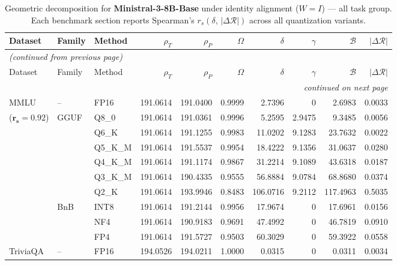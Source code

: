 \begingroup
\small
\setlength{\tabcolsep}{4pt}
\renewcommand{\arraystretch}{1.05}
\setlength{\LTcapwidth}{\textwidth}
\begin{longtable}{ll l rrrrrrr}
\caption{Geometric decomposition for \textbf{Ministral-3-8B-Base} under identity alignment ($W{=}I$) --- all task group. Each benchmark section reports Spearman's $r_s(\delta,\,|\Delta\mathcal{R}|)$ across all quantization variants.}\label{tab:mistral_decomposition_all}\\
\toprule
Dataset & Family & Method & $\rho_T$ & $\rho_P$ & $\Omega$ & $\delta$ & $\gamma$ & $\mathcal{B}$ & $|\Delta\mathcal{R}|$ \\
\midrule
\endfirsthead
\multicolumn{10}{l}{\small\itshape (continued from previous page)}\\
\toprule
Dataset & Family & Method & $\rho_T$ & $\rho_P$ & $\Omega$ & $\delta$ & $\gamma$ & $\mathcal{B}$ & $|\Delta\mathcal{R}|$ \\
\midrule
\endhead
\midrule
\multicolumn{10}{r}{\small\itshape continued on next page}\\
\endfoot
\bottomrule
\endlastfoot
MMLU & -- & FP16 & 191.0614 & 191.0400 & 0.9999 & 2.7396 & \cellcolor{cyan!12} $0$ & 2.6983 & 0.0033 \\
{\small ($\mathbf{r_s{=}0.92}$)} & GGUF & Q8\_0 & 191.0614 & 191.0361 & 0.9996 & 5.2595 & 2.9475 & 9.3485 & 0.0056 \\
 &  & Q6\_K & 191.0614 & 191.1255 & 0.9983 & 11.0202 & 9.1283 & 23.7632 & 0.0022 \\
 &  & Q5\_K\_M & 191.0614 & 191.5537 & 0.9954 & 18.4222 & 9.1356 & 31.0637 & 0.0280 \\
 &  & Q4\_K\_M & 191.0614 & 191.1174 & 0.9867 & 31.2214 & 9.1089 & 43.6318 & 0.0187 \\
 &  & Q3\_K\_M & 191.0614 & 190.4335 & 0.9555 & 56.8884 & 9.0784 & 68.8680 & 0.0374 \\
 &  & Q2\_K & 191.0614 & 193.9946 & \cellcolor{red!18} 0.8483 & \cellcolor{red!18} 106.0716 & 9.2112 & \cellcolor{red!18} 117.4963 & \cellcolor{red!18} 0.5035 \\
 & BnB & INT8 & 191.0614 & 191.2144 & 0.9956 & 17.9674 & \cellcolor{cyan!12} $0$ & 17.6961 & 0.0156 \\
 &  & NF4 & 191.0614 & 190.9183 & 0.9691 & 47.4992 & \cellcolor{cyan!12} $0$ & 46.7819 & 0.0910 \\
 &  & FP4 & 191.0614 & 191.5727 & 0.9503 & 60.3029 & \cellcolor{cyan!12} $0$ & 59.3922 & 0.0558 \\
\midrule
TriviaQA & -- & FP16 & 194.0526 & 194.0211 & 1.0000 & 0.0315 & \cellcolor{cyan!12} $0$ & 0.0311 & 0.0034 \\

\end{longtable}
